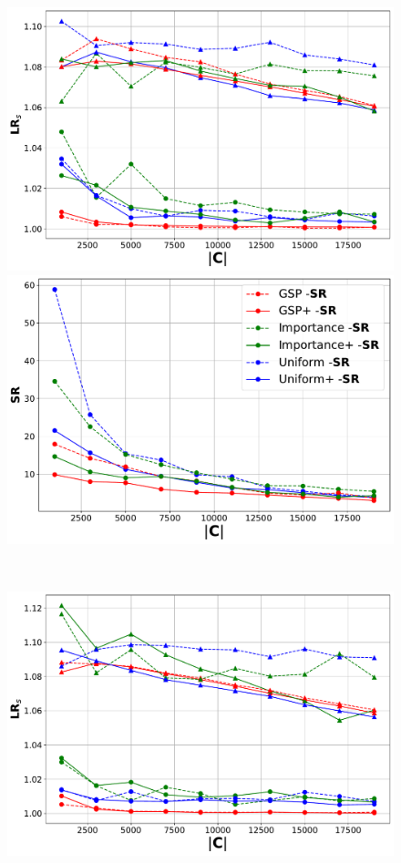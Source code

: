 \begin{figure}
\begin{minipage}{0.49\linewidth}
        \includegraphics[width=\linewidth]{./fig/loss_ratio(0.2,0.05) - MNIST.pdf}
    \end{minipage}
    \hfill
    \begin{minipage}{0.49\linewidth}
        \centering
        \includegraphics[width=\linewidth]{./fig/time_ratio(0.2,0.05) - MNIST.pdf}
    \end{minipage}
    \\
    \begin{minipage}{0.49\linewidth}
        \centering
        \includegraphics[width=\linewidth]{./fig/loss_ratio(0.2,0.05) - CIFAR-10.pdf}

\end{minipage}
\end{figure}
